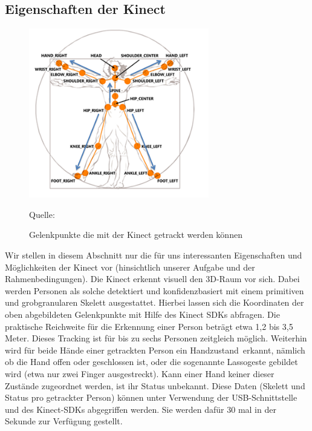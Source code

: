 \subsection{Eigenschaften der Kinect} 
\begin{figure}[htbp] 
  \centering
     \includegraphics[width=0.7\textwidth]{skeletal.png}
     
  \caption{Gelenkpunkte die mit der Kinect getrackt werden können}
  \footnotesize Quelle: \cite{tracking}
  \label{fig:Bild1}
\end{figure}

	Wir stellen in diesem Abschnitt nur die für uns interessanten Eigenschaften und Möglichkeiten der Kinect vor (hinsichtlich unserer Aufgabe und der Rahmenbedingungen). Die Kinect erkennt visuell den 3D-Raum vor sich. Dabei werden Personen als solche detektiert und konfidenzbasiert mit einem primitiven und grobgranularen Skelett ausgestattet. Hierbei lassen sich die Koordinaten der oben abgebildeten Gelenkpunkte mit Hilfe des Kinect SDKs abfragen. Die praktische Reichweite für die Erkennung einer Person beträgt etwa 1,2 bis 3,5 Meter. Dieses Tracking ist für bis zu sechs Personen zeitgleich möglich. Weiterhin wird für beide Hände einer getrackten Person ein \glqq Handzustand\grqq~erkannt, nämlich ob die Hand offen oder geschlossen ist, oder die sogenannte Lassogeste gebildet wird (etwa nur zwei Finger ausgestreckt). Kann einer Hand keiner dieser Zustände zugeordnet werden, ist ihr Status unbekannt. Diese Daten (Skelett und Status pro getrackter Person) können unter Verwendung der USB-Schnittstelle und des Kinect-SDKs abgegriffen werden. Sie werden dafür 30 mal in der Sekunde zur Verfügung gestellt.